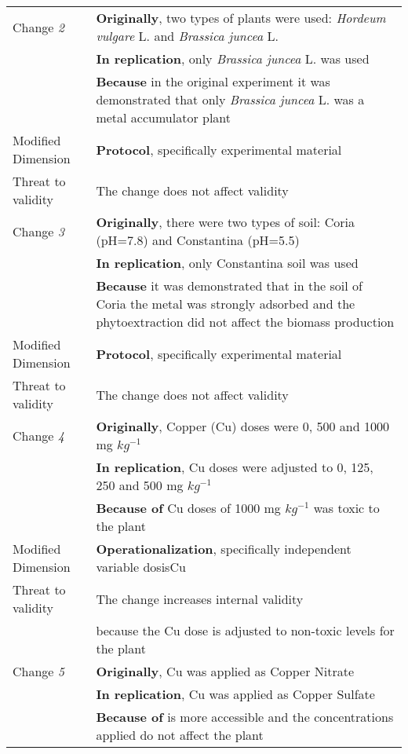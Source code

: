 \begin{table*}[h]
\begin{tabularx}{\textwidth}{
  >{\hsize=0.25\hsize}X
  >{\hsize=0.8\hsize}X}
    Change \textit{2}   & \textbf{Originally}, two types of plants were used: \emph{Hordeum vulgare} L. and \emph{Brassica juncea} L. \\& \textbf{In replication}, only \emph{Brassica juncea} L. was used \\& \textbf{Because} in the original experiment it was demonstrated that only \emph{Brassica juncea} L. was a metal accumulator plant\\  

    Modified Dimension & 
    \textbf{Protocol}, specifically experimental
    material \\   
    Threat to validity  & The change does not affect validity  \\  \hline
 
    Change \textit{3}   & \textbf{Originally}, there were two types of soil: Coria (pH=7.8) and Constantina (pH=5.5) \\& \textbf{In replication}, only Constantina soil was used \\& \textbf{Because} it was demonstrated that in the soil of Coria the metal was strongly adsorbed and the phytoextraction did not affect the biomass production
    \\  
     Modified Dimension & 
    \textbf{Protocol}, specifically experimental
    material \\   
    Threat to validity  & The change does not affect validity  \\  \hline

    Change \textit{4}   & \textbf{Originally}, Copper (Cu) doses were 0, 500 and 1000 mg $kg^{-1}$ \\& \textbf{In replication}, Cu doses were adjusted to 0, 125, 250 and 500 mg $kg^{-1}$ 
    \\& \textbf{Because of} Cu doses of 1000 mg $kg^{-1}$ was toxic to the plant \\  
 
    Modified Dimension & 
    \textbf{Operationalization}, specifically independent variable dosisCu\\   
    Threat to validity  & The change increases internal validity \\ & because the Cu dose is adjusted to non-toxic levels for the plant\\ 
\hline
    Change \textit{5}   & \textbf{Originally}, Cu was applied as Copper Nitrate \\& \textbf{In replication}, Cu was applied as Copper Sulfate
    \\& \textbf{Because of} is more accessible and the concentrations applied do not affect the plant \\  
 

\end{tabularx}
\end{table*}
